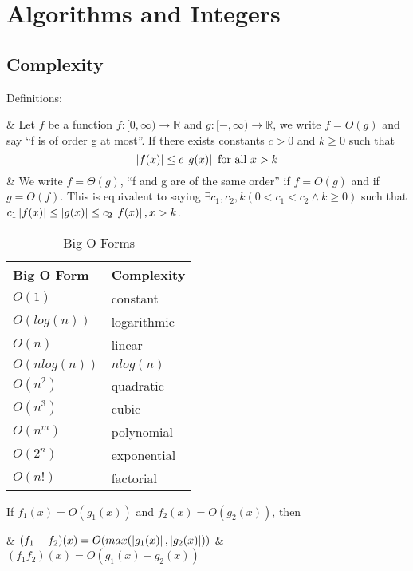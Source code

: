 \section{Algorithms and Integers}
    \subsection{Complexity}
    \begin{thm}
        Definitions:
        \NewList
        \begin{easylist}[enumerate]
            & Let $f$ be a function $f:[0, \infty) \to \mathbb{R}$ and $g:[-, \infty ) \to \mathbb{R}$, we write $f = O(g)$ and say ``f is of order g at most''. If there exists constants $c > 0$ and $k \ge 0$ such that
                \[ \left\lvert f(x) \right\rvert \le c \left\lvert g(x) \right\rvert \text{ for all } x > k \]
            & We write $f = \Theta(g)$, ``f and g are of the same order'' if $f = O(g)$ and if $g = O(f)$. This is equivalent to saying $\exists c_1, c_2, k (0 < c_1 < c_2 \wedge k \ge 0)$ such that $c_1 \left\lvert f(x) \right\rvert \le \left\lvert g(x) \right\rvert \le c_2 \left\lvert f(x) \right\rvert, x > k$.
        \end{easylist}
    \end{thm}

    \begin{table}
        \centering
        \begin{tabular}{l|l}
            Big O Form& Complexity\\
            \hline
            $O(1)$ & constant\\
            $O(log(n))$ & logarithmic\\
            $O(n)$ & linear\\
            $O(n log(n))$ & $n log(n)$\\
            $O(n^2)$ & quadratic\\
            $O(n^3)$ & cubic\\
            $O(n^m)$ & polynomial\\
            $O(2^n)$ & exponential\\
            $O(n!)$ & factorial\\
        \end{tabular}
        \caption{Big O Forms}
        \label{table:bigo}
    \end{table}

    \begin{thm}
        If $f_1(x) = O(g_1(x))$ and $f_2(x) = O(g_2(x))$, then
            \NewList
            \begin{easylist}[enumerate]
                & $(f_1 + f_2)(x) = O(max(\left\lvert g_1(x) \right\rvert, \left\lvert g_2(x) \right\rvert))$
                & $(f_1 f_2)(x) = O(g_1(x) - g_2(x))$
            \end{easylist}
    \end{thm}


